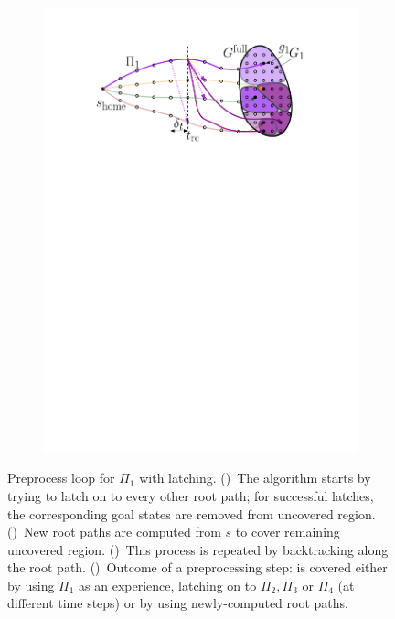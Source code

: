 \documentclass[conference]{IEEEtran}
\begin{document}
\begin{figure}[t]
\begin{subfigure}{.225\textwidth}
        \includegraphics[width=\textwidth]{Latching_4}
        \caption{}
        \label{fig:pl4}
    \end{subfigure}
    \caption{\CaptionTextSize
    Preprocess loop for $\Pi_1$ with latching.
    ()~The algorithm starts by trying to latch on to every other root path; for successful latches, the corresponding goal states are removed from uncovered region.
    ()~New root paths are computed from $s$ to cover remaining uncovered region.
    ()~This process is repeated by backtracking along the root path.
    ()~Outcome of a preprocessing step: \Gfull is covered either by using $\Pi_1$ as an experience, 
    latching on to $\Pi_2,\Pi_3$ or  $\Pi_4$ (at different time steps)
    or by 
    using newly-computed root paths. 
    }
    \label{fig:pl}
\end{figure}
\end{document}
